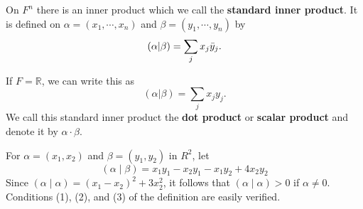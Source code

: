 \documentclass[main.tex]{subfiles}
\begin{document}
\begin{example}
On $F^n$ there is an inner product which we call the \textbf{standard inner product}. It is defined on $\alpha = (x_1, \cdots, x_n)$ and $\beta = (y_1, \cdots, y_n)$ by 
\begin{equation}
    (\alpha |\beta ) = \sum_j x_j \Bar{y}_j.
\end{equation}

If $F = \mathbb{R}$, we can write this as 
\begin{equation}
    (\alpha |\beta ) = \sum_j x_j y_j. 
\end{equation}
We call this standard inner product the \textbf{dot product} or \textbf{scalar product} and denote it by $\alpha \cdot \beta$. 
\end{example}

\begin{example}
    For $\alpha=\left(x_1, x_2\right)$ and $\beta=\left(y_1, y_2\right)$ in $R^2$, let
    $$
    (\alpha \mid \beta)=x_1 y_1-x_2 y_1-x_1 y_2+4 x_2 y_2
    $$
    Since $(\alpha \mid \alpha)=\left(x_1-x_2\right)^2+3 x_2^2$, it follows that $(\alpha \mid \alpha)>0$ if $\alpha \neq 0$. Conditions (1), (2), and (3) of the definition are easily verified.
\end{example}
\end{document}

